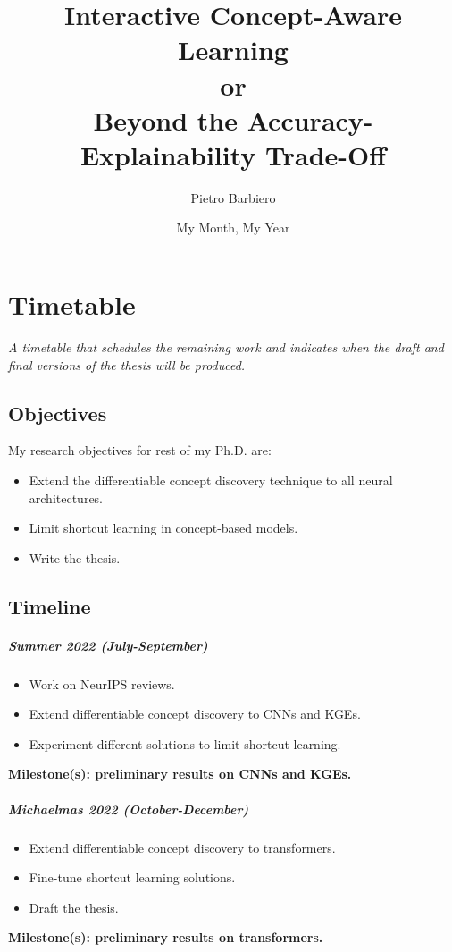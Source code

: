 \documentclass[withindex,glossary]{cam-thesis}
\title{Interactive Concept-Aware Learning\\or\\Beyond the Accuracy-Explainability Trade-Off}
\author{Pietro Barbiero}
\date{My Month, My Year}
\begin{document}
\frontmatter{}



\chapter*{Timetable}
\textit{A timetable that schedules the remaining work and indicates when the draft and final versions of the thesis will be produced.}


\section*{Objectives}
My research objectives for rest of my Ph.D. are:
\begin{itemize}
    \item Extend the differentiable concept discovery technique to all neural architectures.
    \item Limit shortcut learning in concept-based models.
    \item Write the thesis.
\end{itemize}


\section*{Timeline}

\paragraph{Summer 2022 (July-September)}
\begin{itemize}
    \item Work on NeurIPS reviews.
    \item Extend differentiable concept discovery to CNNs and KGEs.
	\item Experiment different solutions to limit shortcut learning.
\end{itemize}
\textbf{Milestone(s): preliminary results on CNNs and KGEs.}

\paragraph{Michaelmas 2022 (October-December)}
\begin{itemize}
	\item Extend differentiable concept discovery to transformers.
	\item Fine-tune shortcut learning solutions.
	\item Draft the thesis.
\end{itemize}
\textbf{Milestone(s): preliminary results on transformers.}
\end{document}
